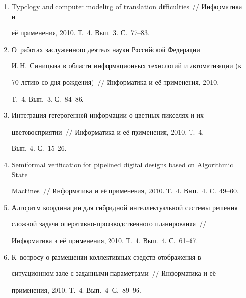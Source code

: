 \begin{enumerate}[1.]
Когнитивно-лингвистические представления в системах обработки 


текстов~/\!\!/  Информатика и её применения, 2010. Т.~4. Вып.~3. С.~69--76.


\item {}


Typology and computer modeling of translation difficulties~/\!\!/  Информатика и 


её применения, 2010. Т.~4. Вып.~3. С.~77--83.


\item {}


О~работах заслуженного деятеля науки Российской Федерации 


И.\,Н.~Синицына в области информационных технологий и автоматизации (к 


70-ле\-тию со дня рождения)~/\!\!/  Информатика и её применения, 2010. 


Т.~4. Вып.~3. С.~84--86.


\item {}


Интеграция гетерогенной информации о цветных пикселях и их 


цветовосприятии~/\!\!/  Информатика и её применения, 2010. Т.~4. 


Вып.~4. С.~15--26.


\item {}


Semiformal verification for pipelined digital designs based on Algorithmic State 


Machines~/\!\!/  Информатика и её применения, 2010. Т.~4. Вып.~4. С.~49--60.


\item {}


Алгоритм координации для гибридной интеллектуальной системы решения 


сложной задачи оперативно-про\-из\-вод\-ст\-вен\-но\-го планирования~/\!\!/  


Информатика и её применения, 2010. Т.~4. Вып.~4. С.~61--67.


\item {}


К~вопросу о размещении коллективных средств отображения в 


ситуационном зале с заданными параметрами~/\!\!/  Информатика и её 


применения, 2010. Т.~4. Вып.~4. С.~89--96.


  \end{enumerate}





